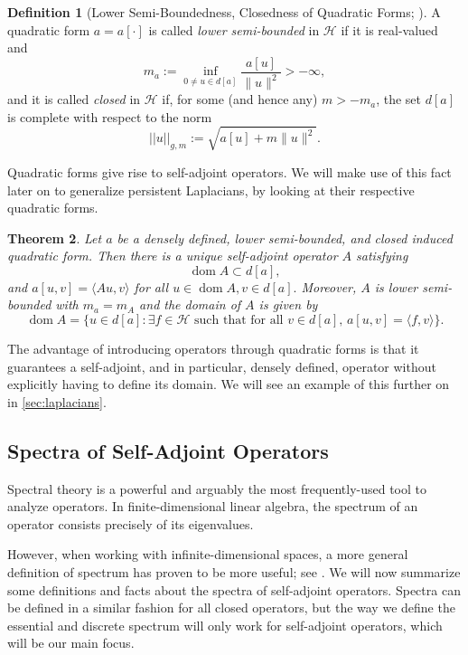 \documentclass[11pt]{article}
\newtheorem{theorem}{Theorem}[section]
\theoremstyle{definition}
\newtheorem{definition}[theorem]{Definition}
\theoremstyle{remark}
\DeclareMathOperator\dom{dom}
\begin{document}
\begin{definition}[Lower Semi-Boundedness, Closedness of Quadratic Forms; \citet{schroedingerop}] \label{def:quadratic_form}
    A quadratic form $a=a[\cdot]$ is called \textit{lower semi-bounded} in $\mathcal{H}$ if it is real-valued and 
    $$m_a:=\inf_{0\neq u \in d[a]}\frac{a[u]}{\|u\|^2}>-\infty,$$
and it is called \textit{closed} in $\mathcal{H}$ if, for some (and hence any) $m>-m_a$, the set $d[a]$ is complete with respect to the norm
    $$||u||_{g,m}:=\sqrt{a[u]+m\|u\|^2}.$$
\end{definition}

Quadratic forms give rise to self-adjoint operators. We will make use of this fact later on to generalize persistent Laplacians, by looking at their respective quadratic forms.

\begin{theorem}\textnormal{\citep[Theorem 1.18]{schroedingerop}} \label{a-induced A}
    Let $a$ be a densely defined, lower semi-bounded, and closed induced quadratic form. Then there is a unique self-adjoint operator $A$ satisfying \begin{equation*}\label{domain_of_a}
        \dom A\subset d[a],
    \end{equation*}
    and $a[u,v]=\langle Au,v\rangle$ for all $u\in\dom A,v\in d[a].$
    Moreover, $A$ is lower semi-bounded with $m_a=m_A$ and the domain of $A$ is given by
    $$
    \dom A=\{u\in d[a]:\text{$\exists f\in\mathcal{H}$ such that for all $v\in d[a],\, a[u,v]=\langle f,v\rangle$}\}.
    $$
\end{theorem}

The advantage of introducing operators through quadratic forms is that it guarantees a self-adjoint, and in particular, densely defined, operator without explicitly having to define its domain. We will see an example of this further on in \cref{sec:laplacians}. 

\subsection{Spectra of Self-Adjoint Operators} \label{subsec:spectra}

Spectral theory is a powerful and arguably the most frequently-used tool to analyze operators. In finite-dimensional linear algebra, the spectrum of an operator consists precisely of its eigenvalues.

However, when working with infinite-dimensional spaces, a more general definition of spectrum has proven to be more useful; see \citet[p.~12]{schroedingerop}. We will now summarize some definitions and facts about the spectra of self-adjoint operators. Spectra can be defined in a similar fashion for all closed operators, but the way we define the essential and discrete spectrum will only work for self-adjoint operators, which will be our main focus.
\end{document}
